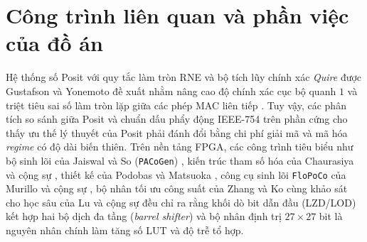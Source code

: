 \section{Công trình liên quan và phần việc của đồ án}
Hệ thống số Posit với quy tắc làm tròn RNE và bộ tích lũy chính xác \textit{Quire}
được Gustafson và Yonemoto đề xuất nhằm nâng cao độ chính xác cục bộ quanh $1$ và
triệt tiêu sai số làm tròn lặp giữa các phép MAC liên tiếp
\cite{gustafson2017posit,positstandard2022}. Tuy vậy, các phân tích so sánh giữa
Posit và chuẩn dấu phẩy động IEEE-754 trên phần cứng
\cite{dinechin2019posits,ciocirlan2021accuracy} cho thấy ưu thế lý thuyết của
Posit phải đánh đổi bằng chi phí giải mã và mã hóa \textit{regime} có độ dài biến
thiên. Trên nền tảng FPGA, các công trình tiêu biểu như bộ sinh lõi của Jaiswal
và So (\texttt{PACoGen}) \cite{jaiswal2018posit,jaiswal2019pacogen}, kiến trúc
tham số hóa của Chaurasiya và cộng sự \cite{chaurasiya2018parameterized}, thiết kế
của Podobas và Matsuoka \cite{podobas2018posit}, công cụ sinh lõi \texttt{FloPoCo}
của Murillo và cộng sự \cite{murillo2020flopoco,murillo2022energy}, bộ nhân tối ưu
công suất của Zhang và Ko \cite{zhang2020positmul} cùng khảo sát cho học sâu của
Lu và cộng sự \cite{lu2020evaluation} đều chỉ ra rằng khối dò bit dẫn đầu (LZD/LOD)
kết hợp hai bộ dịch đa tầng (\textit{barrel shifter}) và bộ nhân định trị $27\times 27$
bit là nguyên nhân chính làm tăng số LUT và độ trễ tổ hợp.

